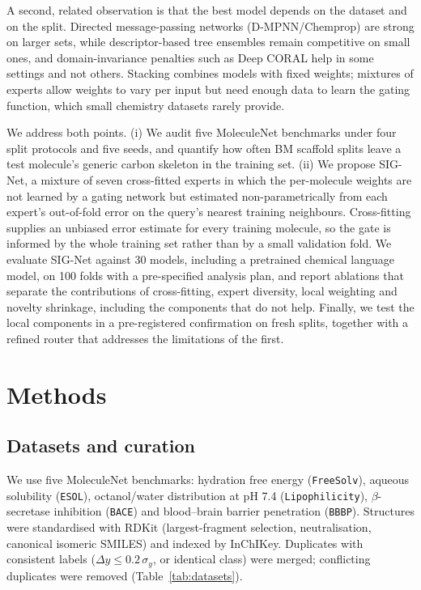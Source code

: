 \documentclass[journal=jcisd8,manuscript=article]{achemso}
\begin{document}
A second, related observation is that the best model depends on the dataset and on the split. Directed message-passing networks (D-MPNN/Chemprop)\cite{yang2019analyzing,heid2024chemprop} are strong on larger sets, while descriptor-based tree ensembles remain competitive on small ones\cite{yang2019analyzing}, and domain-invariance penalties such as Deep CORAL\cite{sun2016deep} help in some settings and not others. Stacking\cite{wolpert1992stacked} combines models with fixed weights; mixtures of experts\cite{jacobs1991adaptive} allow weights to vary per input but need enough data to learn the gating function, which small chemistry datasets rarely provide.

We address both points. (i) We audit five MoleculeNet benchmarks under four split protocols and five seeds, and quantify how often BM scaffold splits leave a test molecule's generic carbon skeleton in the training set. (ii) We propose SIG-Net, a mixture of seven cross-fitted experts in which the per-molecule weights are not learned by a gating network but estimated non-parametrically from each expert's out-of-fold error on the query's nearest training neighbours. Cross-fitting supplies an unbiased error estimate for every training molecule, so the gate is informed by the whole training set rather than by a small validation fold. We evaluate SIG-Net against 30 models, including a pretrained chemical language model, on 100 folds with a pre-specified analysis plan, and report ablations that separate the contributions of cross-fitting, expert diversity, local weighting and novelty shrinkage, including the components that do not help. Finally, we test the local components in a pre-registered confirmation on fresh splits, together with a refined router that addresses the limitations of the first.

\section{Methods}

\subsection{Datasets and curation}
We use five MoleculeNet benchmarks\cite{wu2018moleculenet}: hydration free energy (\texttt{FreeSolv}\cite{mobley2014freesolv}), aqueous solubility (\texttt{ESOL}\cite{delaney2004esol}), octanol/water distribution at pH 7.4 (\texttt{Lipophilicity}), $\beta$-secretase inhibition (\texttt{BACE}\cite{subramanian2016bace}) and blood--brain barrier penetration (\texttt{BBBP}\cite{martins2012bbbp}). Structures were standardised with RDKit\cite{rdkit} (largest-fragment selection, neutralisation, canonical isomeric SMILES) and indexed by InChIKey. Duplicates with consistent labels ($\Delta y \le 0.2\,\sigma_y$, or identical class) were merged; conflicting duplicates were removed (Table~\ref{tab:datasets}).
\end{document}
